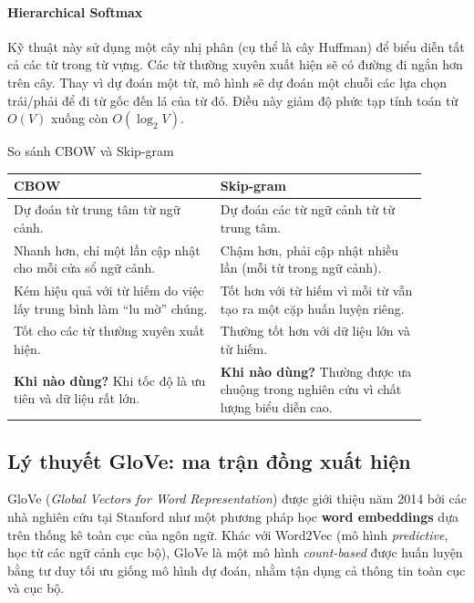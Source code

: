 \paragraph{Hierarchical Softmax}
Kỹ thuật này sử dụng một cây nhị phân (cụ thể là cây Huffman) để biểu diễn tất cả các từ trong từ vựng. Các từ thường xuyên xuất hiện sẽ có đường đi ngắn hơn trên cây. Thay vì dự đoán một từ, mô hình sẽ dự đoán một chuỗi các lựa chọn trái/phải để đi từ gốc đến lá của từ đó. Điều này giảm độ phức tạp tính toán từ $O(V)$ xuống còn $O(\log_2V)$.

\begin{assess}{So sánh CBOW và Skip-gram}
\begin{tabular}{p{0.45\linewidth} | p{0.45\linewidth}}
    \textbf{CBOW} & \textbf{Skip-gram} \\
    \hline
    Dự đoán từ trung tâm từ ngữ cảnh. & Dự đoán các từ ngữ cảnh từ từ trung tâm. \\
    \hline
    Nhanh hơn, chỉ một lần cập nhật cho mỗi cửa sổ ngữ cảnh. & Chậm hơn, phải cập nhật nhiều lần (mỗi từ trong ngữ cảnh). \\
    \hline
    Kém hiệu quả với từ hiếm do việc lấy trung bình làm “lu mờ” chúng. & Tốt hơn với từ hiếm vì mỗi từ vẫn tạo ra một cặp huấn luyện riêng. \\
    \hline
    Tốt cho các từ thường xuyên xuất hiện. & Thường tốt hơn với dữ liệu lớn và từ hiếm. \\
    \hline
    \textbf{Khi nào dùng?} Khi tốc độ là ưu tiên và dữ liệu rất lớn. & \textbf{Khi nào dùng?} Thường được ưa chuộng trong nghiên cứu vì chất lượng biểu diễn cao. \\
\end{tabular}
\end{assess}

\subsection{Lý thuyết GloVe: ma trận đồng xuất hiện}
\label{ssec:glove}

GloVe \cite{pennington2014glove} (\textit{Global Vectors for Word Representation}) được giới thiệu năm 2014 bởi các nhà nghiên cứu tại Stanford như một phương pháp học \textbf{word embeddings} dựa trên thống kê toàn cục của ngôn ngữ. 
Khác với Word2Vec (mô hình \textit{predictive}, học từ các ngữ cảnh cục bộ), GloVe là một mô hình \textit{count-based} được huấn luyện bằng tư duy tối ưu giống mô hình dự đoán, nhằm tận dụng cả thông tin toàn cục và cục bộ.

